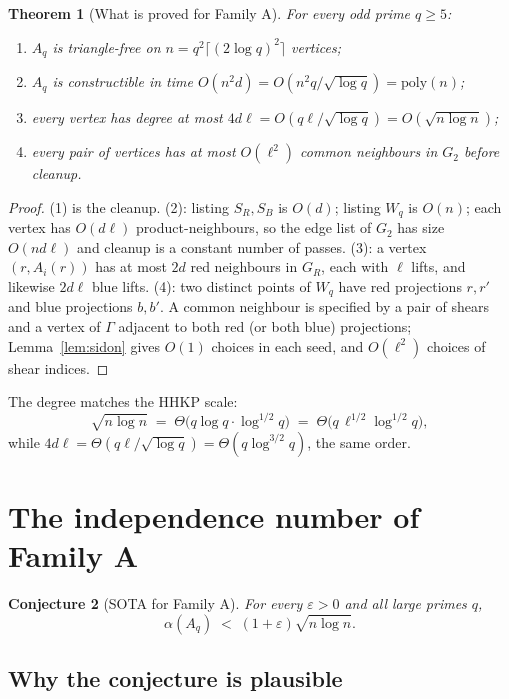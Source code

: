 \documentclass[11pt]{article}
\newtheorem{theorem}{Theorem}
\newtheorem{conjecture}[theorem]{Conjecture}
\theoremstyle{definition}
\newcommand{\eps}{\varepsilon}
\begin{document}
\begin{theorem}[What is proved for Family A]\label{thm:A-uncond}
For every odd prime $q\ge 5$:
\begin{enumerate}
  \item $A_{q}$ is triangle-free on $n=q^{2}\lceil(2\log q)^{2}\rceil$ vertices;
  \item $A_{q}$ is constructible in time $O(n^{2}d)=O(n^{2}q/\sqrt{\log q})=\mathrm{poly}(n)$;
  \item every vertex has degree at most $4d\ell=O(q\ell/\sqrt{\log q})=O(\sqrt{n\log n})$;
  \item every pair of vertices has at most $O(\ell^{2})$ common neighbours in $G_{2}$ before cleanup.
\end{enumerate}
\end{theorem}

\begin{proof}
(1) is the cleanup.
(2): listing $S_{R},S_{B}$ is $O(d)$; listing $W_{q}$ is $O(n)$; each vertex has $O(d\ell)$ product-neighbours, so the edge list of $G_{2}$ has size $O(nd\ell)$ and cleanup is a constant number of passes.
(3): a vertex $(r,A_{i}(r))$ has at most $2d$ red neighbours in $G_{R}$, each with $\ell$ lifts, and likewise $2d\ell$ blue lifts.
(4): two distinct points of $W_{q}$ have red projections $r,r'$ and blue projections $b,b'$.
A common neighbour is specified by a pair of shears and a vertex of $\Gamma$ adjacent to both red (or both blue) projections; Lemma~\ref{lem:sidon} gives $O(1)$ choices in each seed, and $O(\ell^{2})$ choices of shear indices.
\end{proof}

The degree matches the HHKP scale:
\[
  \sqrt{n\log n}
  \;=\;
  \Theta\bigl(q\log q\cdot\log^{1/2}q\bigr)
  \;=\;
  \Theta\bigl(q\,\ell^{1/2}\log^{1/2}q\bigr),
\]
while $4d\ell=\Theta(q\ell/\sqrt{\log q})=\Theta(q\log^{3/2}q)$, the same order.

\section{The independence number of Family A}

\begin{conjecture}[SOTA for Family A]\label{conj:A}
For every $\eps>0$ and all large primes $q$,
\[
  \alpha(A_{q})\;<\;(1+\eps)\sqrt{n\log n}.
\]
\end{conjecture}

\subsection{Why the conjecture is plausible}
\end{document}
